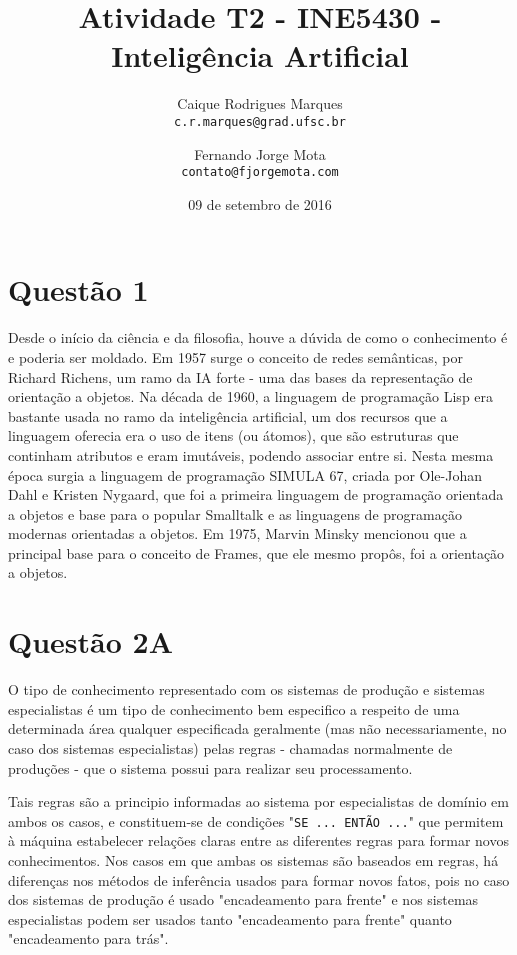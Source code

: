 \documentclass{article}
\title{\textbf{Atividade T2 - INE5430 - Inteligência Artificial}}
\author{
    Caique Rodrigues Marques \\
    {\texttt{c.r.marques@grad.ufsc.br}}
    \and
    Fernando Jorge Mota \\
    {\texttt{contato@fjorgemota.com}}
    \vspace{-5mm}
}
\date{09 de setembro de 2016}
\begin{document}
\maketitle

\section*{Questão 1}
    Desde o início da ciência e da filosofia, houve a dúvida de como o
    conhecimento é e poderia ser moldado. Em 1957 surge o conceito de redes
    semânticas, por Richard Richens, um ramo da IA forte - uma das bases da
    representação de orientação a objetos. Na década de 1960, a linguagem de
    programação Lisp era bastante usada no ramo da inteligência artificial, um
    dos recursos que a linguagem oferecia era o uso de itens (ou átomos), que
    são estruturas que continham atributos e eram imutáveis, podendo associar
    entre si. Nesta mesma época surgia a linguagem de programação SIMULA 67,
    criada por Ole-Johan Dahl e Kristen Nygaard, que foi a primeira linguagem
    de programação orientada a objetos e base para o popular Smalltalk e as
    linguagens de programação modernas orientadas a objetos. Em 1975, Marvin
    Minsky mencionou que a principal base para o conceito de Frames, que ele
    mesmo propôs, foi a orientação a objetos.

\section*{Questão 2A}
    O tipo de conhecimento representado com os sistemas de produção e sistemas
    especialistas é um tipo de conhecimento bem especifico a respeito de uma
    determinada área qualquer especificada geralmente (mas não necessariamente,
    no caso dos sistemas especialistas) pelas regras - chamadas normalmente de
    produções - que o sistema possui para realizar seu processamento. 
    
    Tais regras são a principio informadas ao sistema por especialistas de
    domínio em ambos os casos, e constituem-se de condições "\texttt{SE ...
    ENTÃO ...}" que permitem à máquina estabelecer relações claras entre as
    diferentes regras para formar novos conhecimentos. Nos casos em que ambas
    os sistemas são baseados em regras, há diferenças nos métodos de inferência
    usados para formar novos fatos, pois no caso dos sistemas de produção é
    usado "encadeamento para frente" e nos sistemas especialistas podem ser
    usados tanto "encadeamento para frente" quanto "encadeamento para trás".
    
\end{document}
